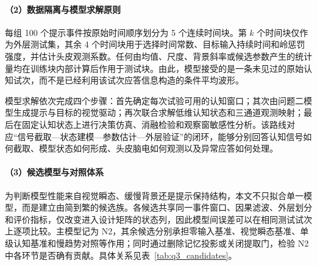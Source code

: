 \documentclass[a4paper]{ctexart}
\numberwithin{figure}{section}       %
\begin{document}
\begin{table}[H]
\centering
\caption{认知模型分层结构表}
\label{tab:q3_route}
\end{table}

\paragraph{（2）数据隔离与模型求解原则}

每组 100 个提示事件按原始时间顺序划分为 5 个连续时间块。第 $k$ 个时间块仅作为外层测试集，其余 4 个时间块用于选择时间常数、目标输入持续时间和岭惩罚强度，并估计头皮观测系数。任何由均值、尺度、背景斜率或候选参数产生的统计量均在训练块内部计算后作用于测试块。由此，模型接受的是一条未见过的原始认知试次，而不是已经利用该试次应答信息构造的条件平均波形。

模型求解依次完成四个步骤：首先确定每次试验可用的认知窗口；其次由问题二模型生成提示与目标的视觉驱动；再次联合求解低维认知状态和三通道观测映射；最后在固定认知状态上进行决策仿真、消融检验和观察窗敏感性分析。该路线对应“信号截取---状态建模---参数估计---外层验证”的闭环，能够分别回答认知信号如何截取、模型状态如何形成、头皮脑电如何观测以及异常应答如何处理。

\paragraph{（3）候选模型与对照体系}

为判断模型性能来自视觉瞬态、缓慢背景还是提示保持结构，本文不只拟合单一模型，而是建立由简到繁的候选族。各候选共享同一事件窗口、因果滤波、外层划分和评价指标，仅改变进入设计矩阵的状态列，因此模型间误差可以在相同测试试次上逐项比较。主模型记为 N2，其余候选分别承担零输入基准、视觉瞬态基准、单级认知基准和慢趋势对照等作用；同时通过删除记忆投影或关闭提取门，检验 N2 中各环节是否确有贡献。具体关系见表~\ref{tab:q3_candidates}。
\end{document}
